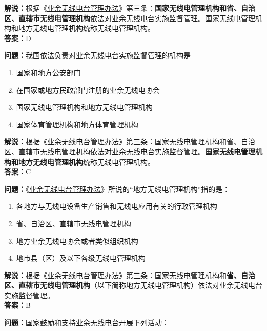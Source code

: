 \textbf{解说：}根据《\href{https://www.miit.gov.cn/jgsj/zfs/bmgz/art/2020/art_147b69815b3641caad9047735f94c860.html}{业余无线电台管理办法}》第三条：\textbf{国家无线电管理机构和省、自治区、直辖市无线电管理机构}依法对业余无线电台实施监督管理。国家无线电管理机构和地方无线电管理机构统称无线电管理机构。\\\textbf{答案：}D


\textbf{问题：}我国依法负责对业余无线电台实施监督管理的机构是

\begin{enumerate}[label=\Alph*), leftmargin=1cm]
	\item 国家和地方公安部门
	\item 在国家或地方民政部门注册的业余无线电协会
	\item 国家无线电管理机构和地方无线电管理机构
	\item 国家体育管理机构和地方体育管理机构
\end{enumerate}

\textbf{解说：}根据《\href{https://www.miit.gov.cn/jgsj/zfs/bmgz/art/2020/art_147b69815b3641caad9047735f94c860.html}{业余无线电台管理办法}》第三条：国家无线电管理机构和省、自治区、直辖市无线电管理机构依法对业余无线电台实施监督管理。\textbf{国家无线电管理机构和地方无线电管理机构}统称无线电管理机构。\\\textbf{答案：}C


\textbf{问题：}《\href{https://www.miit.gov.cn/jgsj/zfs/bmgz/art/2020/art_147b69815b3641caad9047735f94c860.html}{业余无线电台管理办法}》所说的“地方无线电管理机构”指的是：

\begin{enumerate}[label=\Alph*), leftmargin=1cm]
	\item 各地方与无线电设备生产销售和无线电应用有关的行政管理机构
	\item 省、自治区、直辖市无线电管理机构
	\item 地方业余无线电协会或者类似组织机构
	\item 地市县（区）及以下各级无线电管理机构
\end{enumerate}

\textbf{解说：}根据《\href{https://www.miit.gov.cn/jgsj/zfs/bmgz/art/2020/art_147b69815b3641caad9047735f94c860.html}{业余无线电台管理办法}》第三条：国家无线电管理机构和\textbf{省、自治区、直辖市无线电管理机构}（以下简称地方无线电管理机构）依法对业余无线电台实施监督管理。\\\textbf{答案：}B


\textbf{问题：}国家鼓励和支持业余无线电台开展下列活动：

